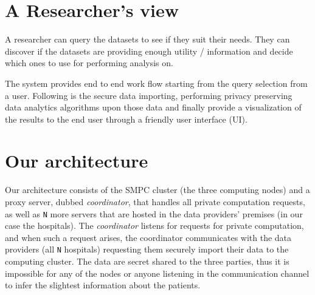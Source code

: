 \section{A Researcher's view}
A researcher can query the datasets to see if they suit their needs.
They can discover if the datasets are providing enough utility / information and decide which ones to use for performing analysis on.

The system provides end to end work flow starting from the query selection from a user.
Following is the secure data importing, performing privacy preserving data analytics algorithms upon those data and finally provide a visualization of the results to the end user through a friendly user interface (UI).


%
%


\section{Our architecture }\label{s:architecture}
Our architecture consists of the SMPC cluster (the three computing nodes) and a proxy server, dubbed \textit{coordinator}, that handles all private computation requests, as well as \texttt{N} more servers that are hosted in the data providers' premises (in our case the hospitals).
The \textit{coordinator} listens for requests for private computation, and when such a request arises, the coordinator communicates with the data providers (all \texttt{N} hospitals) requesting them securely import their data to the computing cluster.
The data are secret shared to the three parties, thus it is impossible for any of the nodes or anyone listening in the communication channel to infer the slightest information about the patients.



